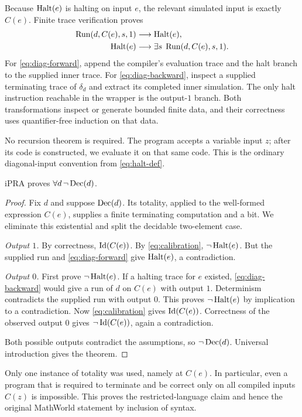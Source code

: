 Because $\operatorname{Halt}(e)$ is halting on input $e$, the relevant simulated input
is exactly $C(e)$. Finite trace verification proves
\begin{align}
 \operatorname{Run}(d,C(e),s,1)&\longrightarrow\operatorname{Halt}(e),
       \label{eq:diag-forward}\\
 \operatorname{Halt}(e)&\longrightarrow\exists s\;\operatorname{Run}(d,C(e),s,1).
       \label{eq:diag-backward}
\end{align}
For \eqref{eq:diag-forward}, append the compiler's evaluation trace and
the halt branch to the supplied inner trace. For
\eqref{eq:diag-backward}, inspect a supplied terminating trace of
$\delta_d$ and extract its completed inner simulation. The only halt
instruction reachable in the wrapper is the output-$1$ branch. Both
transformations inspect or generate bounded finite data, and their
correctness uses quantifier-free induction on that data.

No recursion theorem is required. The program accepts a variable input
$z$; after its code is constructed, we evaluate it on that same code.
This is the ordinary diagonal-input convention from
\eqref{eq:halt-def}.

\begin{theorem}\label{thm:no-decider}
iPRA proves $\forall d\,\neg\operatorname{Dec}(d)$.
\end{theorem}
\begin{proof}
Fix $d$ and suppose $\operatorname{Dec}(d)$. Its totality, applied to the well-formed
expression $C(e)$, supplies a finite terminating computation and a bit.
We eliminate this existential and split the decidable two-element case.

\emph{Output $1$.} By correctness, $\operatorname{Id}(C(e))$. By
\eqref{eq:calibration}, $\neg\operatorname{Halt}(e)$. But the supplied run and
\eqref{eq:diag-forward} give $\operatorname{Halt}(e)$, a contradiction.

\emph{Output $0$.} First prove $\neg\operatorname{Halt}(e)$. If a halting trace for
$e$ existed, \eqref{eq:diag-backward} would give a run of $d$ on $C(e)$
with output $1$. Determinism contradicts the supplied run with output
$0$. This proves $\neg\operatorname{Halt}(e)$ by implication to a contradiction.
Now \eqref{eq:calibration} gives $\operatorname{Id}(C(e))$. Correctness of the
observed output $0$ gives $\neg\operatorname{Id}(C(e))$, again a contradiction.

Both possible outputs contradict the assumptions, so $\neg\operatorname{Dec}(d)$.
Universal introduction gives the theorem.
\end{proof}

Only one instance of totality was used, namely at $C(e)$. In particular,
even a program that is required to terminate and be correct only on all
compiled inputs $C(z)$ is impossible. This proves the restricted-language
claim and hence the original MathWorld statement by inclusion of syntax.

